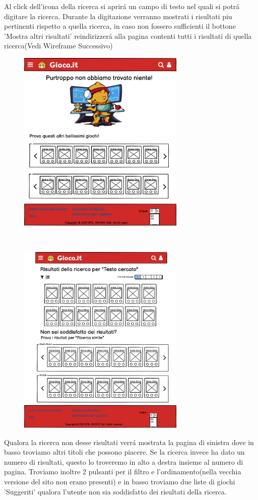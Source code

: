 \documentclass[../Report.tex]{subfiles}
\begin{document}
    Al click dell'icona della ricerca si aprirá un campo di testo nel quali si potrá digitare la ricerca.
    Durante la digitazione verranno mostrati i risultati piu pertinenti rispetto a quella ricerca, in caso non fossero sufficienti il bottone 'Mostra altri risultati' reindirizzerá alla pagina contenti tutti i risultati di quella ricerca(Vedi Wireframe Successivo)

    \begin{figure}[H]
        \begin{minipage}[b]{8cm}
            \centering
            \includegraphics[width=8cm]{WEmpySearchResult.png}
            \end{minipage}
            \ \hspace{2mm} \hspace{3mm} \
            \begin{minipage}[b]{8cm}
            \centering
            \includegraphics[width=8cm]{WSearchResult.png}
        \end{minipage}
    \end{figure}
    Qualora la ricerca non desse risultati verrá mostrata la pagina di sinistra dove in basso troviamo altri titoli che possono piacere.
    Se la ricerca invece ha dato un numero di risultati, questo lo troveremo in alto a destra insieme al numero di pagina. Troviamo inoltre 2 pulsanti per il filtro e l'ordinamento(nella vecchia versione del sito non erano presenti) e in basso troviamo due liste di giochi 'Suggeriti' qualora l'utente non sia soddisfatto dei risultati della ricerca.
    
\end{document}
